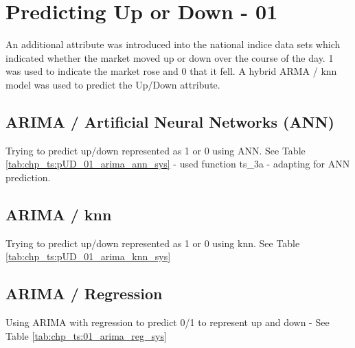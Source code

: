 

\section{Predicting Up or Down - 01}
An additional attribute was introduced into the national indice data sets which indicated whether the market moved up or down over the course of the day. 1 was used to indicate the market rose and 0 that it fell. A hybrid ARMA / knn model was used to predict the Up/Down attribute.

\subsection{ARIMA / Artificial Neural Networks (ANN)}
Trying to predict up/down represented as 1 or 0 using ANN. See Table \ref{tab:chp_ts:pUD_01_arima_ann_sys} - used function ts\_3a - adapting for ANN prediction.



\subsection{ARIMA / knn}
Trying to predict up/down represented as 1 or 0 using knn. See Table \ref{tab:chp_ts:pUD_01_arima_knn_sys}




\subsection{ARIMA / Regression}
Using ARIMA with regression to predict 0/1 to represent up and down - See Table \ref{tab:chp_ts:01_arima_reg_sys}


